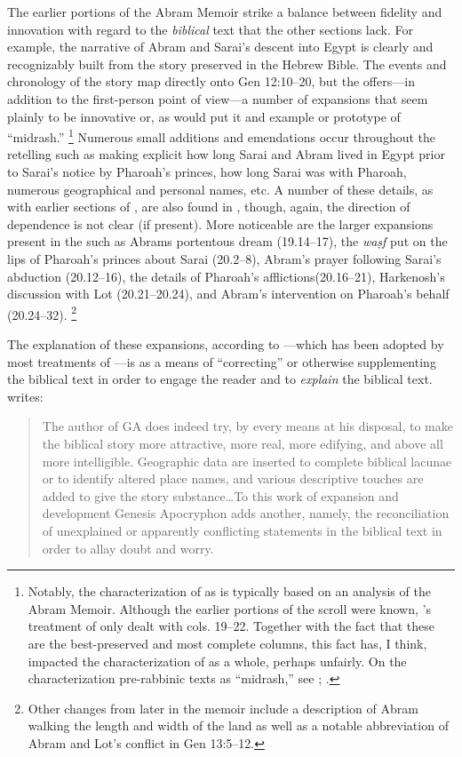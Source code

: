 The earlier portions of the Abram Memoir strike a balance between fidelity and innovation with regard to the \emph{biblical} text that the other sections lack. For example, the narrative of Abram and Sarai's descent into Egypt is clearly and recognizably built from the story preserved in the Hebrew Bible. The events and chronology of the story map directly onto Gen 12:10--20, but the \ga offers---in addition to the first-person point of view---a number of expansions that seem plainly to be innovative or, as \vermes would put it and example or prototype of ``midrash.''%
%
\footnote{\cite[124]{vermes1961} Notably, the characterization of \ga as \rwb is typically based on an analysis of the Abram Memoir. Although the earlier portions of the scroll were known, \vermes's treatment of \ga only dealt with cols. 19--22. Together with the fact that these are the best-preserved and most complete columns, this fact has, I think, impacted the characterization of \ga as a whole, perhaps unfairly. On the characterization pre-rabbinic texts as ``midrash,'' see \cite[GET PAGE RANGE]{mandel2017}; \cite{mandel_bakhos2006}.}
% 
Numerous small additions and emendations occur throughout the retelling such as making explicit how long Sarai and Abram lived in Egypt prior to Sarai's notice by Pharoah's princes, how long Sarai was with Pharoah, numerous geographical and personal names, etc. A number of these details, as with earlier sections of \ga, are also found in \jub, though, again, the direction of dependence is not clear (if present). More noticeable are the larger expansions present in the \ga such as Abrams portentous dream (19.14--17), the \emph{waṣf} put on the lips of Pharoah's princes about Sarai (20.2--8), Abram's prayer following Sarai's abduction (20.12--16), the details of Pharoah's afflictions(20.16--21), Harkenosh's discussion with Lot (20.21--20.24), and Abram's intervention on Pharoah's behalf (20.24--32).%
%
\footnote{Other changes from later in the memoir include a description of Abram walking the length and width of the land as well as a notable abbreviation of Abram and Lot's conflict in Gen 13:5--12.}

The explanation of these expansions, according to \vermes---which has been adopted by most treatments of \ga---is as a means of ``correcting'' or otherwise supplementing the biblical text in order to engage the reader and to \emph{explain} the biblical text.\autocite[126]{vermes1961} \vermes writes:

\begin{quote}
The author of GA does indeed try, by every means at his disposal, to make the biblical story more attractive, more real, more edifying, and above all more intelligible. Geographic data are inserted to complete biblical lacunae or to identify altered  place names, and various descriptive touches are added to give the story substance\dots To this work of expansion and development Genesis Apocryphon adds another, namely, the reconciliation of unexplained or apparently conflicting statements in the biblical text in order to allay doubt and worry.\autocite[125]{vermes1961}
\end{quote}

